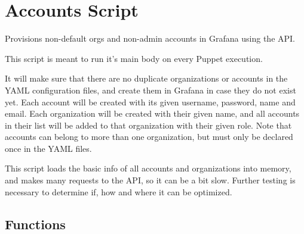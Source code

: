 \documentclass[letterpaper,10pt,english]{sphinxmanual}
\begin{document}
\chapter{Accounts Script}
\label{\detokenize{accounts:module-gpAccounts}}\label{\detokenize{accounts:accounts-script}}\label{\detokenize{accounts::doc}}
Provisions non-default orgs and non-admin accounts in Grafana using the API.

This script is meant to run it’s main body on every Puppet execution.

It will make sure that there are no duplicate organizations or accounts in the
YAML configuration files, and create them in Grafana in case they do not exist
yet. Each account will be created with its given username, password, name and
email. Each organization will be created with their given name, and all
accounts in their list will be added to that organization with their given
role. Note that accounts can belong to more than one organization, but must
only be declared once in the YAML files.

This script loads the basic info of all accounts and organizations into memory,
and makes many requests to the API, so it can be a bit slow. Further testing is
necessary to determine if, how and where it can be optimized.


\section{Functions}
\label{\detokenize{accounts:functions}}
\end{document}
